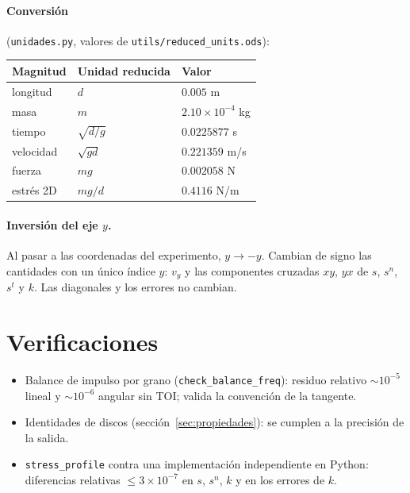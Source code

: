 \documentclass[11pt,a4paper]{article}
\newcommand{\code}[1]{\texttt{#1}}
\begin{document}
\paragraph{Conversión} (\code{unidades.py}, valores de
\code{utils/reduced\_units.ods}):
\begin{center}
\begin{tabular}{lll}
  \toprule
  Magnitud & Unidad reducida & Valor \\
  \midrule
  longitud & $d$ & $0.005$ m \\
  masa & $m$ & $2.10 \times 10^{-4}$ kg \\
  tiempo & $\sqrt{d/g}$ & $0.0225877$ s \\
  velocidad & $\sqrt{gd}$ & $0.221359$ m/s \\
  fuerza & $mg$ & $0.002058$ N \\
  estrés 2D & $mg/d$ & $0.4116$ N/m \\
  \bottomrule
\end{tabular}
\end{center}

\paragraph{Inversión del eje $y$.} Al pasar a las coordenadas del
experimento, $y \to -y$. Cambian de signo las cantidades con un único
índice $y$: $v_y$ y las componentes cruzadas $xy$, $yx$ de $s$, $s^n$,
$s^t$ y $k$. Las diagonales y los errores no cambian.

\section{Verificaciones}

\begin{itemize}
  \item Balance de impulso por grano (\code{check\_balance\_freq}):
    residuo relativo $\sim 10^{-5}$ lineal y $\sim 10^{-6}$ angular sin
    TOI; valida la convención de la tangente.
  \item Identidades de discos (sección~\ref{sec:propiedades}): se cumplen a la
    precisión de la salida.
  \item \code{stress\_profile} contra una implementación independiente en
    Python: diferencias relativas $\le 3 \times 10^{-7}$ en $s$, $s^n$,
    $k$ y en los errores de $k$.
\end{itemize}
\end{document}
